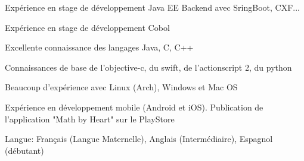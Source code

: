 \begin{cvitems}
\item{Expérience en stage de développement Java EE Backend avec SringBoot, CXF...}
\item{Expérience en stage de développement Cobol}
\item{Excellente connaissance des langages Java, C, C++}
\item{Connaissances de base de l'objective-c, du swift, de l'actionscript 2, du python}
\item{Beaucoup d'expérience avec Linux (Arch), Windows et Mac OS}
\item{Expérience en développement mobile (Android et iOS). Publication de l'application "Math by Heart" sur le PlayStore}
\item{Langue: Français (Langue Maternelle), Anglais (Intermédiaire), Espagnol (débutant)}
\end{cvitems}
